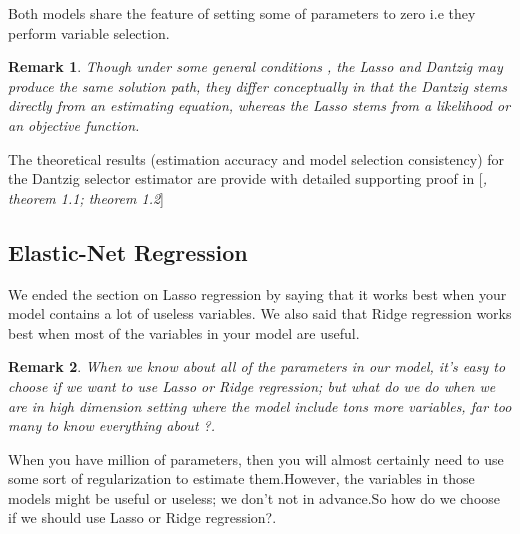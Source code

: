 \documentclass[12pt]{report}
\newtheorem{remarque}{Remark}[section]
\begin{document}
Both models share the feature of setting some of parameters to zero i.e they perform variable selection.

\begin{remarque}
	Though under some general conditions , the Lasso and Dantzig may produce the same solution path, they differ conceptually in that the Dantzig stems directly from an estimating equation, whereas the Lasso stems from a likelihood or an objective function.
\end{remarque}
The theoretical results (estimation accuracy and model selection consistency) for the Dantzig selector estimator are provide with detailed supporting proof in [\textit{\cite{nref12}, theorem 1.1; theorem 1.2}]
	\subsection{Elastic-Net Regression}
We ended the section on Lasso regression by saying that it works best when your model contains a lot of useless variables. We also said that Ridge regression works best when most of the variables in your model are useful.

\begin{remarque}
	When we know about all of the parameters in our model, it's easy to choose if we want to use Lasso or Ridge regression; but what do we do when we are in high dimension setting where the model include tons more variables, far too many to know everything about ?.
\end{remarque}

When you have million of parameters, then you will almost certainly need to use some sort of regularization to estimate them.However, the variables in those models might be useful or useless; we don't not in advance.So how do we choose if we should use Lasso or Ridge regression?.
\end{document}
